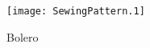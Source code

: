 \documentclass[10pt]{article}
\begin{document}
  
\begin{figure}[!ht]

\texttt{[image: SewingPattern.1]}
\caption{Bolero}
\end{figure}
\end{document}
